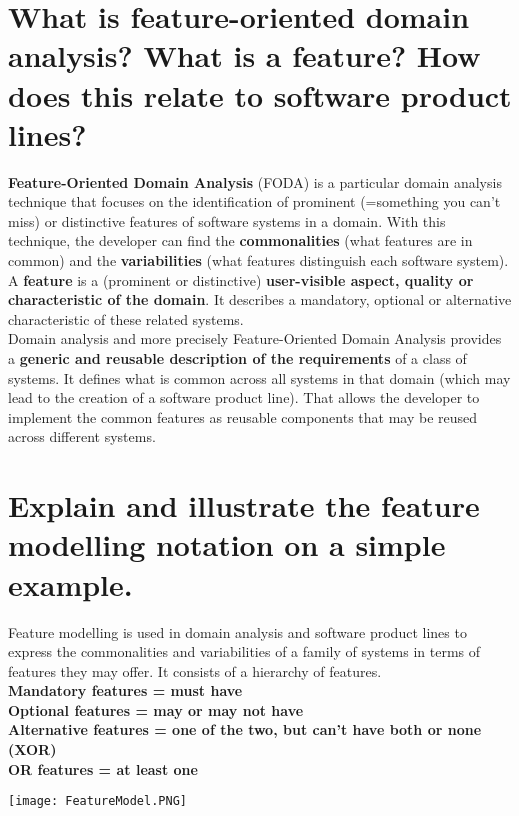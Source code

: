 \section{What is feature-oriented domain analysis? What is a feature?
How does this relate to software product lines?}

\textbf{Feature-Oriented Domain Analysis} (FODA) is a particular domain analysis technique that focuses on the identification of prominent (=something you can’t miss) or distinctive features of software systems in a domain. With this technique, the developer can find the \textbf{commonalities} (what features are in common) and the \textbf{variabilities} (what features distinguish each software system).\\

A \textbf{feature} is a (prominent or distinctive) \textbf{user-visible aspect, quality or characteristic of the domain}. It describes a mandatory, optional or alternative characteristic of these related systems.\\

Domain analysis and more precisely Feature-Oriented Domain Analysis provides a \textbf{generic and reusable description of the requirements} of a class of systems. It defines what is common across all systems in that domain (which may lead to the creation of a software product line). That allows the developer to implement the common features as reusable components that may be reused across different systems.

\section{Explain and illustrate the feature modelling notation on a simple example.}

Feature modelling is used in domain analysis and software product lines to express the commonalities and variabilities of a family of systems in terms of features they may offer. It consists of a hierarchy of features.\\

\textbf{Mandatory features = must have}\\
\textbf{Optional features = may or may not have}\\
\textbf{Alternative features = one of the two, but can’t have both or none (XOR)}\\
\textbf{OR features = at least one}\\
\begin{center}
\texttt{[image: FeatureModel.PNG]}
\end{center}

